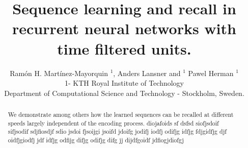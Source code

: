\documentclass{esannV2}
\begin{document}
\title{Sequence learning and recall in recurrent neural networks with time filtered units.}

\author{Ram\'on H. Mart\'inez-Mayorquin $^1$, Anders Lansner and $^1$ Pawel Herman $^1$
%
%
\vspace{.3cm}\\
%
1- KTH Royal Institute of Technology \\
Department of Computational Science and Technology - Stockholm, Sweden.
%
\vspace{.1cm}\\ 
}


\maketitle

\begin{abstract}
We demonstrate among others how the learned sequences can be recalled at different speeds largely independent of the encoding process. diojafoids sf dsfsd siofjsdoif
sifjsodif sdjfiosdjf sdio jsdoi fjsoijgi jsoifd jdoifg jodifj iodfj odifjg idfjg
fdjgidfjg djf oidfjgiodfj jdf idfjg odfijg difjg odifjg difg jj dijdfgoidf 
jdfiogjdiofgj 
\end{abstract}
\end{document}
